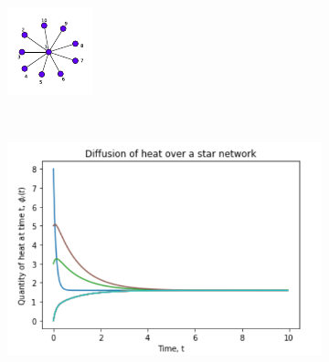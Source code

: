 \documentclass[10pt,a4paper]{article}
\begin{document}
\begin{figure}[!h]
\begin{subfigure}[b]{0.37\textwidth}
		\includegraphics[width=\textwidth]{images/star-difusion.pdf}
		\caption{}
		\label{stardifn-graph}
	\end{subfigure}~
	\begin{subfigure}[b]{0.45\textwidth}
		\includegraphics[width= \textwidth]{images/star-quantity-time.png}
		\caption{}
		\label{stardifn-plot}
	\end{subfigure}\\
	\begin{subfigure}[b]{0.37\textwidth}

\end{subfigure}
\end{figure}
\end{document}
